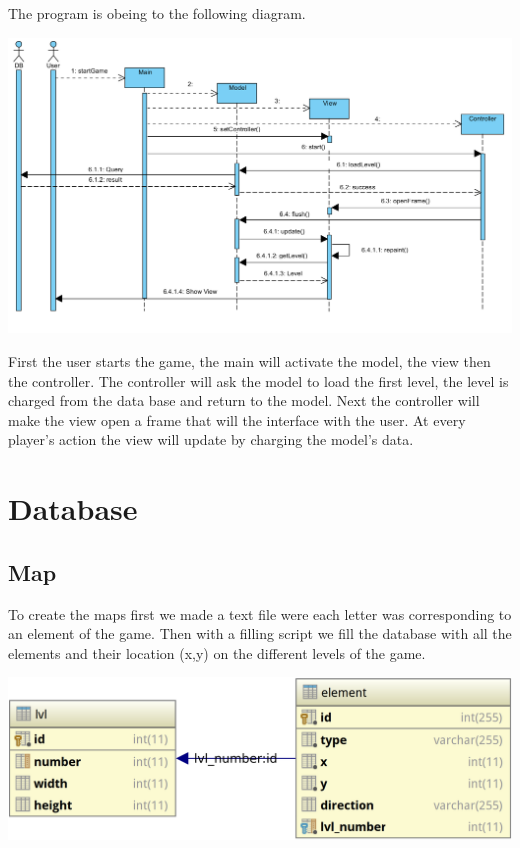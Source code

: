 \documentclass{report}
\begin{document}
The program is obeing to the following diagram.

\begin{center}
\includegraphics[scale=0.6]{resources/sequence.png}
\end{center}

First the user starts the game, the main will activate the model, the view then the controller. The controller will ask the model to load the first level, the level is charged from the data base and return to the model. Next the controller will make the view open a frame that will the interface with the user. At every player’s action the view will update by charging the model’s data.

\section{Database}

\subsection{Map}

To create the maps first we made a text file were each letter was corresponding to an element of the game. Then with a filling script we fill the database with all the elements and their location (x,y) on the different levels of the game.

\begin{center}
\includegraphics[scale=0.2]{resources/MPD.png}
\end{center}
\end{document}

